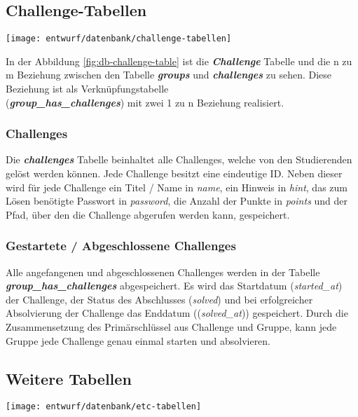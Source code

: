 \subsection{Challenge-Tabellen}
\begin{center}
	\texttt{[image: entwurf/datenbank/challenge-tabellen]}
	\label{fig:db-challenge-table}
\end{center}
In der Abbildung \ref{fig:db-challenge-table} ist die \textbf{\textit{Challenge}} Tabelle und die n zu m Beziehung zwischen den Tabelle \textbf{\textit{groups}} und \textbf{\textit{challenges}} zu sehen. Diese Beziehung ist als Verknüpfungstabelle\\ (\textbf{\textit{group\_has\_challenges}}) mit zwei 1 zu n Beziehung realisiert.

\subsubsection{Challenges}
Die \textbf{\textit{challenges}} Tabelle beinhaltet alle Challenges, welche von den Studierenden gelöst werden können. Jede Challenge besitzt eine eindeutige ID. Neben dieser wird für jede Challenge ein Titel / Name in \textit{name}, ein Hinweis in \textit{hint}, das zum Lösen benötigte Passwort in \textit{password}, die Anzahl der Punkte in \textit{points} und der Pfad, über den die Challenge abgerufen werden kann, gespeichert.

\subsubsection{Gestartete / Abgeschlossene Challenges}
Alle angefangenen und abgeschlossenen Challenges werden in der Tabelle \textbf{\textit{group\_has\_challenges}} abgespeichert. Es wird das Startdatum (\textit{started\_at}) der Challenge, der Status des Abschlusses (\textit{solved}) und bei erfolgreicher Absolvierung der Challenge das Enddatum ((\textit{solved\_at})) gespeichert. Durch die Zusammensetzung des Primärschlüssel aus Challenge und Gruppe, kann jede Gruppe jede Challenge genau einmal starten und absolvieren.

\subsection{Weitere Tabellen}
\begin{center}
	\texttt{[image: entwurf/datenbank/etc-tabellen]}
	\label{fig:db-etc-table}
\end{center}

